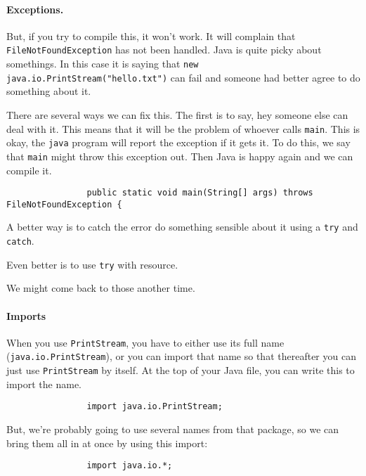 \documentclass{article}
\begin{document}
        \paragraph{Exceptions.}

            But, if you try to compile this, it won't work. It will complain that \texttt{FileNotFoundException} has not been handled. Java
            is quite picky about somethings. In this case it is saying that \texttt{new java.io.PrintStream("hello.txt")} can fail and
            someone had better agree to do something about it.

            There are several ways we can fix this. The first is to say, hey someone else can deal with it. This means that it will be the
            problem of whoever calls \texttt{main}. This is okay, the \texttt{java} program will report the exception if it gets it.
            To do this, we say that \texttt{main} might throw this exception out. Then Java is happy again and we can compile it.
            \begin{verbatim}
                public static void main(String[] args) throws FileNotFoundException {
            \end{verbatim}
             
            A better way is to catch the error do something sensible about it using a \texttt{try} and \texttt{catch}.
             
            Even better is to use \texttt{try} with resource.
             
             We might come back to those another time.
        
        \paragraph{Imports} 
            When you use \texttt{PrintStream}, you have to either use its full name (\texttt{java.io.PrintStream}), or you can import that
            name so that thereafter you can just use \texttt{PrintStream} by itself. At the top of your Java file, you can write this to
            import the name.
        
            \begin{verbatim}
                import java.io.PrintStream;
            \end{verbatim}
        
            But, we're probably going to use several names from that package, so we can bring them all in at once by using this import:
            \begin{verbatim}
                import java.io.*;
            \end{verbatim}
        
\end{document}
